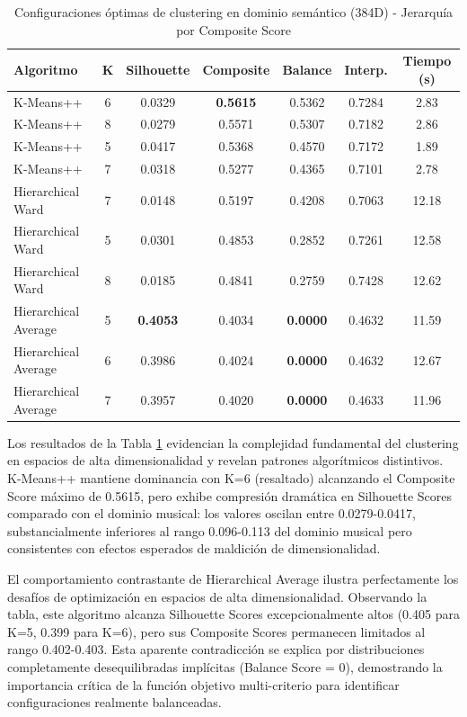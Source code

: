 \documentclass[12pt,a4paper]{report}
\begin{document}
\begin{table}[h]
\centering
\caption{Configuraciones óptimas de clustering en dominio semántico (384D) - Jerarquía por Composite Score}
\label{tab:semantic_comparison}
\begin{tabular}{|l|c|c|c|c|c|c|}
\hline
\textbf{Algoritmo} & \textbf{K} & \textbf{Silhouette} & \textbf{Composite} & \textbf{Balance} & \textbf{Interp.} & \textbf{Tiempo (s)} \\
\hline
\rowcolor{lightgray}
K-Means++ & 6 & 0.0329 & \textbf{0.5615} & 0.5362 & 0.7284 & 2.83 \\
K-Means++ & 8 & 0.0279 & 0.5571 & 0.5307 & 0.7182 & 2.86 \\
K-Means++ & 5 & 0.0417 & 0.5368 & 0.4570 & 0.7172 & 1.89 \\
K-Means++ & 7 & 0.0318 & 0.5277 & 0.4365 & 0.7101 & 2.78 \\
Hierarchical Ward & 7 & 0.0148 & 0.5197 & 0.4208 & 0.7063 & 12.18 \\
Hierarchical Ward & 5 & 0.0301 & 0.4853 & 0.2852 & 0.7261 & 12.58 \\
Hierarchical Ward & 8 & 0.0185 & 0.4841 & 0.2759 & 0.7428 & 12.62 \\
\hline
Hierarchical Average & 5 & \textbf{0.4053} & 0.4034 & \textbf{0.0000} & 0.4632 & 11.59 \\
Hierarchical Average & 6 & 0.3986 & 0.4024 & \textbf{0.0000} & 0.4632 & 12.67 \\
Hierarchical Average & 7 & 0.3957 & 0.4020 & \textbf{0.0000} & 0.4633 & 11.96 \\
\hline
\end{tabular}
\end{table}

Los resultados de la Tabla \ref{tab:semantic_comparison} evidencian la complejidad fundamental del clustering en espacios de alta dimensionalidad y revelan patrones algorítmicos distintivos. K-Means++ mantiene dominancia con K=6 (resaltado) alcanzando el Composite Score máximo de 0.5615, pero exhibe compresión dramática en Silhouette Scores comparado con el dominio musical: los valores oscilan entre 0.0279-0.0417, substancialmente inferiores al rango 0.096-0.113 del dominio musical pero consistentes con efectos esperados de maldición de dimensionalidad.

El comportamiento contrastante de Hierarchical Average ilustra perfectamente los desafíos de optimización en espacios de alta dimensionalidad. Observando la tabla, este algoritmo alcanza Silhouette Scores excepcionalmente altos (0.405 para K=5, 0.399 para K=6), pero sus Composite Scores permanecen limitados al rango 0.402-0.403. Esta aparente contradicción se explica por distribuciones completamente desequilibradas implícitas (Balance Score = 0), demostrando la importancia crítica de la función objetivo multi-criterio para identificar configuraciones realmente balanceadas.
\end{document}
